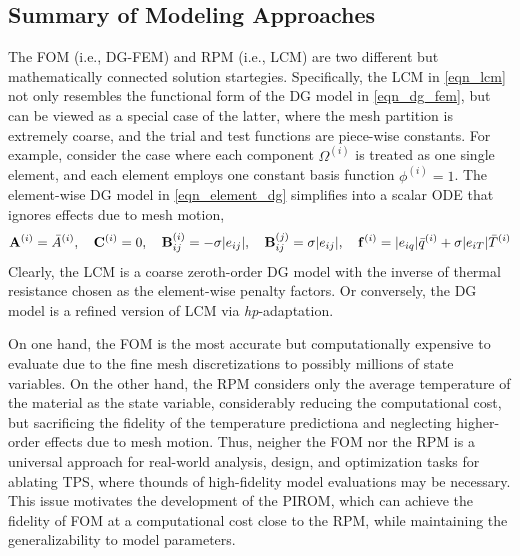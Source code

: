 \subsection{Summary of Modeling Approaches}

The FOM (i.e., DG-FEM) and RPM (i.e., LCM) are two different but mathematically connected solution startegies. Specifically, the LCM in \cref{eqn_lcm} not only resembles the functional form of the DG model in \cref{eqn_dg_fem}, but can be viewed as a special case of the latter, where the mesh partition is extremely coarse, and the trial and test functions are piece-wise constants. For example, consider the case where each component $\Omega^{(i)}$ is treated as one single element, and each element employs one constant basis function $\phi^{(i)}=1$. The element-wise DG model in \cref{eqn_element_dg} simplifies into a scalar ODE that ignores effects due to mesh motion,
\begin{equation}
    \mathbf{A}^{(i)} = \bar{A}^{(i)},\quad \mathbf{C}^{(i)} = 0, \quad\mathbf{B}^{(i)}_{ij} = -\sigma|e_{ij}|,\quad \mathbf{B}^{(j)}_{ij}=\sigma|e_{ij}|,\quad \mathbf{f}^{(i)} = |e_{iq}|\bar{q}^{(i)} + \sigma|e_{iT}|\bar{T}^{(i)}
\end{equation}
Clearly, the LCM is a coarse zeroth-order DG model with the inverse of thermal resistance chosen as the element-wise penalty factors. Or conversely, the DG model is a refined version of LCM via \textit{hp}-adaptation.

On one hand, the FOM is the most accurate but computationally expensive to evaluate due to the fine mesh discretizations to possibly millions of state variables. On the other hand, the RPM considers only the average temperature of the material as the state variable, considerably reducing the computational cost, but sacrificing the fidelity of the temperature predictiona and neglecting higher-order effects due to mesh motion. Thus, neigher the FOM nor the RPM is a universal approach for real-world analysis, design, and optimization tasks for ablating TPS, where thounds of high-fidelity model evaluations may be necessary. This issue motivates the development of the PIROM, which can achieve the fidelity of FOM at a computational cost close to the RPM, while maintaining the generalizability to model parameters.
